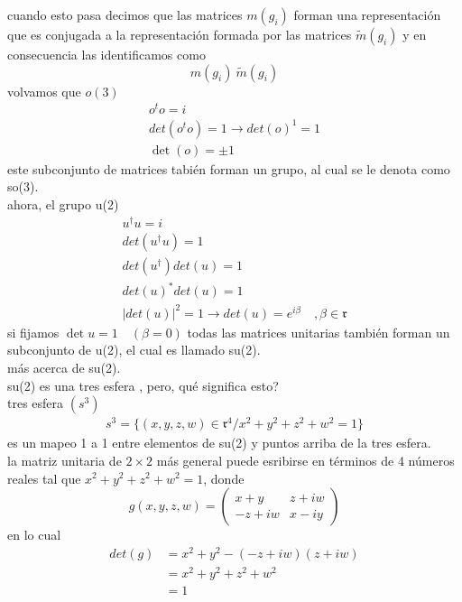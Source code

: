 \documentclass[../main.tex]{subfiles}
\begin{document}
cuando esto pasa decimos que las matrices $m(g_i)$ forman una representación que es conjugada a la representación formada por las matrices $\tilde{m}(g_i)$ y en consecuencia las identificamos como
\begin{equation*}
  m(g_i) ~ \tilde{m}(g_i)
\end{equation*}
volvamos que $o(3)$ 
\begin{align*}
  o^t o = i \\
  det(o^to) = 1 \rightarrow det(o)^1 = 1 \\
  \det(o) = \pm 1
\end{align*}
este subconjunto de matrices tabién forman un grupo, al cual se le denota como so(3). \\
ahora, el grupo u(2)
\begin{align*}
  u^\dagger u = i \\
  det(u^\dagger u)  = 1 \\
  det(u^\dagger) det(u) = 1 \\
  det(u)^* det(u) = 1 \\
  |det(u)|^2 = 1 \rightarrow det(u) = e^{i\beta} \quad , \beta\in\mathfrak{r}
\end{align*}
si fijamos $\det{u}=1 \quad (\beta=0)$ todas las matrices unitarias también forman un subconjunto de u(2), el cual es llamado su(2). \\
más acerca de su(2).\\
su(2) es una tres esfera , pero, qué significa esto? \\
tres esfera $(s^3)$ \\
\begin{align*}
  s^3 = \{(x,y,z,w)\in \mathfrak{r}^4 / x^2 + y^2+ z^2 + w^2 = 1\}
\end{align*}
es un mapeo 1 a 1 entre elementos de su(2) y puntos arriba de la tres esfera. \\
la matriz unitaria de $2\times 2$ más general puede esribirse en términos  de 4 números reales tal que $x^2 + y^2 + z^2 + w^2 = 1$, donde 
\begin{equation*}
  g(x,y,z,w) = \begin{pmatrix} x+y & z+iw \\ -z+iw & x-iy \end{pmatrix}
\end{equation*}
en lo cual
  \begin{align*}
    det(g) & = x^2 + y^2 - (-z+iw)(z+iw) \\
    & = x^2 + y^2 + z^2 + w^2 \\
    & = 1
  \end{align*}
\end{document}
